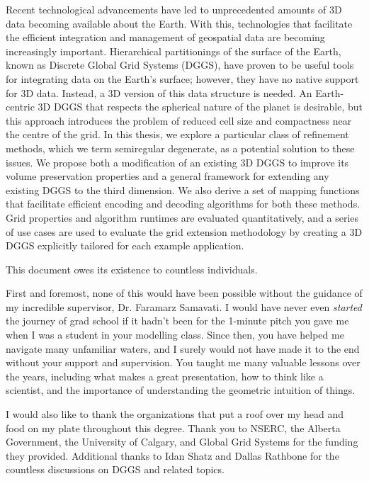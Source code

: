 %
\newpage
{}
{}
\pagestyle{plain}
Recent technological advancements have led to unprecedented amounts of 3D data becoming available about the Earth.
With this, technologies that facilitate the efficient integration and management of geospatial data are becoming increasingly important.
Hierarchical partitionings of the surface of the Earth, known as Discrete Global Grid Systems (DGGS), have proven to be useful tools for integrating data on the Earth's surface; however, they have no native support for 3D data.
Instead, a 3D version of this data structure is needed.
An Earth-centric 3D DGGS that respects the spherical nature of the planet is desirable, but this approach introduces the problem of reduced cell size and compactness near the centre of the grid.
In this thesis, we explore a particular class of refinement methods, which we term semiregular degenerate, as a potential solution to these issues.
We propose both a modification of an existing 3D DGGS to improve its volume preservation properties and a general framework for extending any existing DGGS to the third dimension.
We also derive a set of mapping functions that facilitate efficient encoding and decoding algorithms for both these methods.
Grid properties and algorithm runtimes are evaluated quantitatively, and a series of use cases are used to evaluate the grid extension methodology by creating a 3D DGGS explicitly tailored for each example application.


\newpage
{}
{}
\pagestyle{plain}
This document owes its existence to countless individuals.


First and foremost, none of this would have been possible without the guidance of my incredible supervisor, Dr. Faramarz Samavati.
I would have never even \textit{started} the journey of grad school if it hadn't been for the 1-minute pitch you gave me when I was a student in your modelling class.
Since then, you have helped me navigate many unfamiliar waters, and I surely would not have made it to the end without your support and supervision.
You taught me many valuable lessons over the years, including what makes a great presentation, how to think like a scientist, and the importance of understanding the geometric intuition of things.


I would also like to thank the organizations that put a roof over my head and food on my plate throughout this degree.
Thank you to NSERC, the Alberta Government, the University of Calgary, and Global Grid Systems for the funding they provided.
Additional thanks to Idan Shatz and Dallas Rathbone for the countless discussions on DGGS and related topics.


